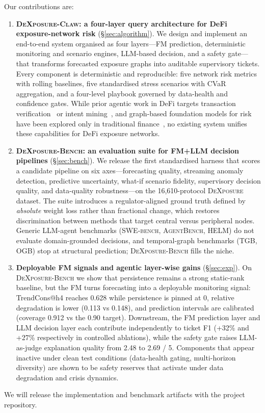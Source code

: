 Our contributions are:
\begin{enumerate}[leftmargin=*, itemsep=2pt]
    \item \textbf{\textsc{DeXposure-Claw}: a four-layer query architecture for DeFi exposure-network risk} (\S\ref{sec:algorithm}). We design and implement an end-to-end system organised as four layers---FM prediction, deterministic monitoring and scenario engines, LLM-based decision, and a safety gate---that transforms forecasted exposure graphs into auditable supervisory tickets. Every component is deterministic and reproducible: five network risk metrics with rolling baselines, five standardised stress scenarios with CVaR aggregation, and a four-level playbook governed by data-health and confidence gates. While prior agentic work in DeFi targets transaction verification~\cite{yao2025arbiter} or intent mining~\cite{mao2025knowyourintent}, and graph-based foundation models for risk have been explored only in traditional finance~\cite{li2025hgmae}, no existing system unifies these capabilities for DeFi exposure networks.

    \item \textbf{\textsc{DeXposure-Bench}: an evaluation suite for FM+LLM decision pipelines} (\S\ref{sec:bench}). We release the first standardised harness that scores a candidate pipeline on six axes---forecasting quality, streaming anomaly detection, predictive uncertainty, what-if scenario fidelity, supervisory decision quality, and data-quality robustness---on the 16{,}610-protocol \textsc{DeXposure} dataset. The suite introduces a regulator-aligned ground truth defined by \emph{absolute} weight loss rather than fractional change, which restores discrimination between methods that target central versus peripheral nodes. Generic LLM-agent benchmarks (\textsc{SWE-bench}, \textsc{AgentBench}, \textsc{HELM}) do not evaluate domain-grounded decisions, and temporal-graph benchmarks (\textsc{TGB}, \textsc{OGB}) stop at structural prediction; \textsc{DeXposure-Bench} fills the niche.

    \item \textbf{Deployable FM signals and agentic layer-wise gains} (\S\ref{sec:exp}). On \textsc{DeXposure-Bench} we show that persistence remains a strong static-rank baseline, but the FM turns forecasting into a deployable monitoring signal: TrendCons@h4 reaches 0.628 while persistence is pinned at 0, relative degradation is lower (0.113 vs 0.148), and prediction intervals are calibrated (coverage 0.912 vs the 0.90 target). Downstream, the FM prediction layer and LLM decision layer each contribute independently to ticket F1 (+32\% and +27\% respectively in controlled ablations), while the safety gate raises LLM-as-judge explanation quality from 2.48 to 2.69 / 5. Components that appear inactive under clean test conditions (data-health gating, multi-horizon diversity) are shown to be safety reserves that activate under data degradation and crisis dynamics.
\end{enumerate}

We will release the implementation and benchmark artifacts with the project repository.
